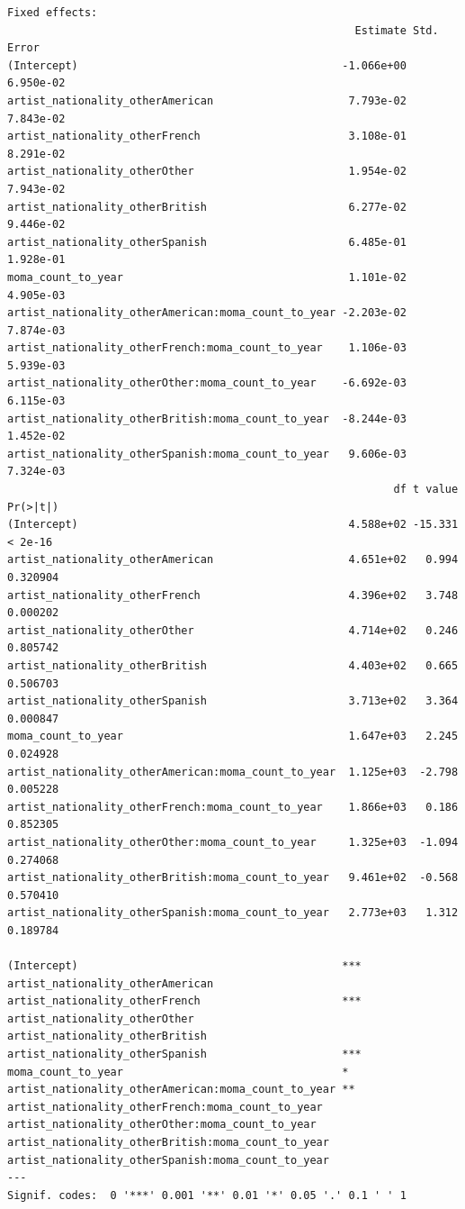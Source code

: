 \documentclass[
  letterpaper,
  DIV=11,
  numbers=noendperiod]{scrreprt}
\begin{document}
\begin{verbatim}
Fixed effects:
                                                      Estimate Std. Error
(Intercept)                                         -1.066e+00  6.950e-02
artist_nationality_otherAmerican                     7.793e-02  7.843e-02
artist_nationality_otherFrench                       3.108e-01  8.291e-02
artist_nationality_otherOther                        1.954e-02  7.943e-02
artist_nationality_otherBritish                      6.277e-02  9.446e-02
artist_nationality_otherSpanish                      6.485e-01  1.928e-01
moma_count_to_year                                   1.101e-02  4.905e-03
artist_nationality_otherAmerican:moma_count_to_year -2.203e-02  7.874e-03
artist_nationality_otherFrench:moma_count_to_year    1.106e-03  5.939e-03
artist_nationality_otherOther:moma_count_to_year    -6.692e-03  6.115e-03
artist_nationality_otherBritish:moma_count_to_year  -8.244e-03  1.452e-02
artist_nationality_otherSpanish:moma_count_to_year   9.606e-03  7.324e-03
                                                            df t value Pr(>|t|)
(Intercept)                                          4.588e+02 -15.331  < 2e-16
artist_nationality_otherAmerican                     4.651e+02   0.994 0.320904
artist_nationality_otherFrench                       4.396e+02   3.748 0.000202
artist_nationality_otherOther                        4.714e+02   0.246 0.805742
artist_nationality_otherBritish                      4.403e+02   0.665 0.506703
artist_nationality_otherSpanish                      3.713e+02   3.364 0.000847
moma_count_to_year                                   1.647e+03   2.245 0.024928
artist_nationality_otherAmerican:moma_count_to_year  1.125e+03  -2.798 0.005228
artist_nationality_otherFrench:moma_count_to_year    1.866e+03   0.186 0.852305
artist_nationality_otherOther:moma_count_to_year     1.325e+03  -1.094 0.274068
artist_nationality_otherBritish:moma_count_to_year   9.461e+02  -0.568 0.570410
artist_nationality_otherSpanish:moma_count_to_year   2.773e+03   1.312 0.189784
                                                       
(Intercept)                                         ***
artist_nationality_otherAmerican                       
artist_nationality_otherFrench                      ***
artist_nationality_otherOther                          
artist_nationality_otherBritish                        
artist_nationality_otherSpanish                     ***
moma_count_to_year                                  *  
artist_nationality_otherAmerican:moma_count_to_year ** 
artist_nationality_otherFrench:moma_count_to_year      
artist_nationality_otherOther:moma_count_to_year       
artist_nationality_otherBritish:moma_count_to_year     
artist_nationality_otherSpanish:moma_count_to_year     
---
Signif. codes:  0 '***' 0.001 '**' 0.01 '*' 0.05 '.' 0.1 ' ' 1


\end{verbatim}
\end{document}
